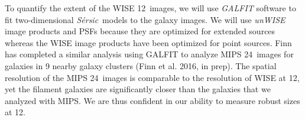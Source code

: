 \documentclass[11pt, preprint]{aastex}
\newcommand{\sers}{{\it S\'{e}rsic}}
\begin{document}
{To quantify the extent of the WISE 12\micron \ images, 
we will use  {\it GALFIT} software \citep{peng02}
to fit two-dimensional \sers \ models to the galaxy images.  We will use {\it unWISE} image products and PSFs \citep{lang14}
because they are optimized for extended sources whereas the WISE
image products have been optimized for point sources.
Finn has completed a similar analysis using GALFIT to analyze MIPS
24\micron \ images for galaxies in 9 nearby galaxy clusters (Finn et
al. 2016, in prep).  The
spatial resolution of the MIPS 24\micron \ images is comparable to the
resolution of WISE at 12\micron, yet the filament galaxies are
significantly closer than the galaxies that we analyzed with MIPS.
We are thus confident in our ability to measure robust sizes at 12\micron.  








}
\end{document}
